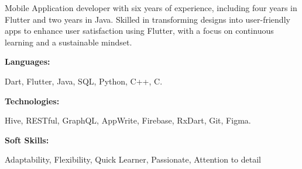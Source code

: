 \documentclass[9pt]{developercv} %
\begin{document}
\begin{minipage}[t]{0.46\textwidth}
	\vspace{-6pt}

	Mobile Application developer with six years of experience,
	including four years in Flutter and two years in Java.
	Skilled in transforming designs into user-friendly apps to enhance user satisfaction using Flutter,
	with a focus on continuous learning and a sustainable mindset.\\

\end{minipage}
\hfill %
\begin{minipage}[t]{0.465\textwidth}
	\vspace{-6pt}

	\begin{minipage}[t]{0.2\textwidth}
		\textbf{Languages:}
	\end{minipage}
	\hfill
	\begin{minipage}[t]{0.73\textwidth}
		Dart, Flutter, Java, SQL, Python, C++, C.
	\end{minipage}
	\vspace{4mm}

	\begin{minipage}[t]{0.2\textwidth}
		\textbf{Technologies:}
	\end{minipage}
	\hfill
	\begin{minipage}[t]{0.73\textwidth}
		Hive, RESTful, GraphQL, AppWrite, Firebase, RxDart, Git, Figma.
	\end{minipage}
	\vspace{4mm}

	\begin{minipage}[t]{0.2\textwidth}
		\textbf{Soft Skills:}
	\end{minipage}
	\hfill
	\begin{minipage}[t]{0.73\textwidth}
		Adaptability, Flexibility, Quick Learner, Passionate, Attention to detail
	\end{minipage}

\end{minipage}
\end{document}

